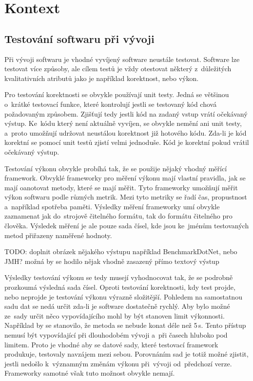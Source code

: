 \chapter{Kontext}

\section{Testování softwaru při vývoji}
Při vývoji softwaru je vhodné vyvíjený software neustále testovat. Software lze testovat
více způsoby, ale cílem testů je vždy otestovat některý z~důležitých kvalitativních
atributů jako je například korektnost, nebo výkon.

Pro testování korektnosti se obvykle používají unit testy. Jedná se většinou o~krátké testovací
funkce, které kontrolují jestli se testovaný kód chová požadovaným způsobem. Zjišťují tedy jestli
kód na zadaný vstup vrátí očekávaný výstup. Ke~kódu který není aktuálně vyvíjen, se obvykle nemění
ani unit testy, a~proto umožňují udržovat neustálou korektnost již hotového kódu. Zda-li je kód
korektní se pomocí unit testů zjistí velmi jednoduše. Kód je korektní pokud vrátil očekávaný
výstup.

Testování výkonu obvykle probíhá tak, že se použije nějaký vhodný měřící framework.
Obvyklé frameworky pro měření výkonu mají vlastní pravidla, jak se mají oanotovat metody, které
se mají měřit. Tyto frameworky umožňují měřit výkon softwaru podle různých metrik. Mezi tyto metriky
se řadí čas, propustnost a~například spotřeba paměti. Výsledky měření frameworky umí obvykle zaznamenat jak do~strojově
čitelného formátu, tak do formátu čitelného pro člověka. Výsledek měření je ale pouze sada čísel, kde
jsou ke~jménům testovaných metod přiřazeny naměřené hodnoty.

TODO: doplnit obrázek nějakého výstupu například BenchmarkDotNet, nebo JMH?
možná by se hodilo nějak vhodně zasazený přímo textový výstup

Výsledky testování výkonu se tedy musejí vyhodnocovat tak, že se podrobně prozkoumá výsledná sada čísel.
Oproti testování korektnosti, kdy test projde, nebo neprojde je testování výkonu výrazně složitější.
Pohledem na samostatnou sadu dat se nedá určit zda-li je software dostatečně rychlý. Aby bylo možné
ze~sady určit něco vypovídajícího mohl by být stanoven limit výkonnosti. Například by se stanovilo, že
metoda se nebude konat déle než 5\,s. Tento přístup nemusí být vypovídající při dlouhodobém vývoji
a~při časech hluboko pod limitem. Proto je vhodné aby se datové sady, které testovací framework produkuje,
testovaly navzájem mezi sebou. Porovnáním sad je totiž možné zjistit, jestli nedošlo k~významným změnám výkonu
při~vývoji od~předchozí verze. Frameworky samotné však tuto možnost obvykle nemají.

